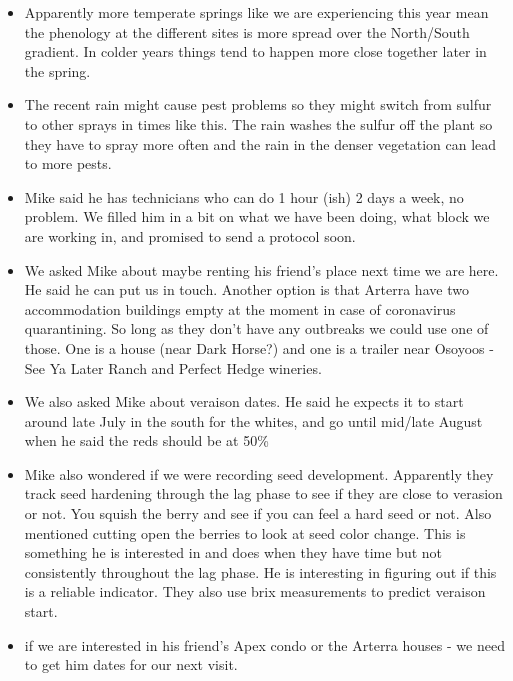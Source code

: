\documentclass[11pt,letter]{article}
\newenvironment{smitemize}{
\begin{itemize}
  \setlength{\itemsep}{0pt}
  \setlength{\parskip}{0.8pt}
  \setlength{\parsep}{0pt}}
{\end{itemize}
}
\begin{document}
\begin{smitemize}
\subsubsection {Notes from meeting with Mike}
\item Apparently more temperate springs like we are experiencing this year mean the phenology at the different sites is more spread over the North/South gradient. In colder years things tend to happen more close together later in the spring.
\item The recent rain might cause pest problems so they might switch from sulfur to other sprays in times like this. The rain washes the sulfur off the plant so they have to spray more often and the rain in the denser vegetation can lead to more pests.
\item Mike said he has technicians who can do 1 hour (ish) 2 days a week, no problem. We filled him in a bit on what we have been doing, what block we are working in, and promised to send a protocol soon. 
\item We asked Mike about maybe renting his friend's place next time we are here. He said he can put us in touch. Another option is that Arterra have two accommodation buildings empty at the moment in case of coronavirus quarantining. So long as they don't have any outbreaks we could use one of those. One is a house (near Dark Horse?) and one is a trailer near Osoyoos - See Ya Later Ranch and Perfect Hedge wineries.     
\item We also asked Mike about veraison dates. He said he expects it to start around late July in the south for the whites, and go until mid/late August when he said the reds should be at 50\%
\item Mike also wondered if we were recording seed development. Apparently they track seed hardening through the lag phase to see if they are close to verasion or not. You squish the berry and see if you can feel a hard seed or not.  Also mentioned cutting open the berries to look at seed color change. This is something he is interested in and does when they have time but not consistently throughout the lag phase. He is interesting in figuring out if this is a reliable indicator. They also use brix measurements to predict veraison start.

\item if we are interested in his friend's Apex condo or the Arterra houses - we need to get him dates for our next visit.

\end{smitemize}
\end{document}
